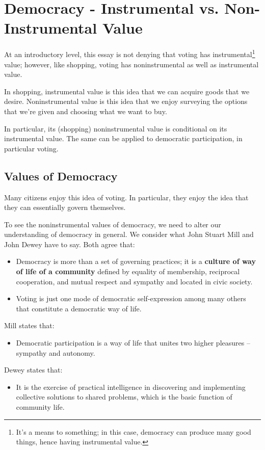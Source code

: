 \documentclass[letterpaper]{article}
\begin{document}
\section{Democracy - Instrumental vs. Non-Instrumental Value}
At an introductory level, this essay is not denying that voting has instrumental\footnote{It's a means to something; in this case, democracy can produce many good things, hence having instrumental value.} value; however, like shopping, voting has noninstrumental as well as instrumental value. 

\bigskip 

In shopping, instrumental value is this idea that we can acquire goods that we desire. Noninstrumental value is this idea that we enjoy surveying the options that we're given and choosing what we want to buy. 

\bigskip 

In particular, its (shopping) noninstrumental value is conditional on its instrumental value. The same can be applied to democratic participation, in particular voting. 

\subsection{Values of Democracy}
Many citizens enjoy this idea of voting. In particular, they enjoy the idea that they can essentially govern themselves. 

\bigskip 

To see the noninstrumental values of democracy, we need to alter our understanding of democracy in general. We consider what John Stuart Mill and John Dewey have to say. Both agree that: 
\begin{itemize}
    \item Democracy is more than a set of governing practices; it is a \textbf{culture of way of life of a community} defined by equality of membership, reciprocal cooperation, and mutual respect and sympathy and located in civic society. 
    \item Voting is just one mode of democratic self-expression among many others that constitute a democratic way of life.
\end{itemize}
Mill states that: 
\begin{itemize}
    \item Democratic participation is a way of life that unites two higher pleasures -- sympathy and autonomy. 
\end{itemize}
Dewey states that:
\begin{itemize}
    \item It is the exercise of practical intelligence in discovering and implementing collective solutions to shared problems, which is the basic function of community life. 
\end{itemize}
\end{document}
